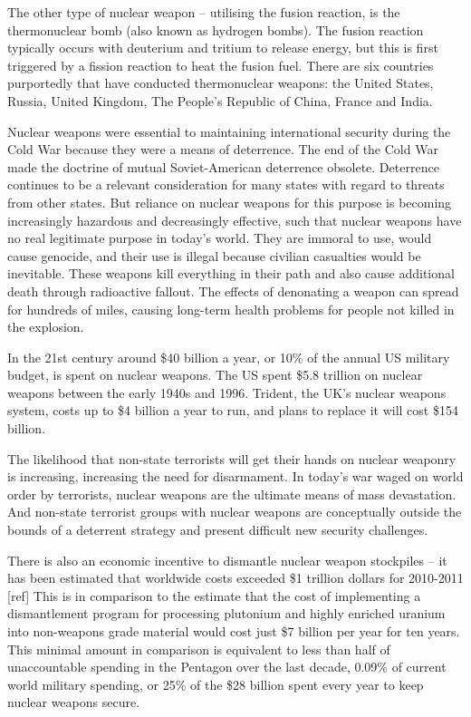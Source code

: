 \documentclass[a4paper]{article}
\begin{document}
The other type of nuclear weapon -- utilising the fusion reaction, is 
the thermonuclear bomb (also known as hydrogen bombs).  The fusion 
reaction typically occurs with deuterium and tritium to release energy, 
but this is first triggered by a fission reaction to heat the fusion fuel. 
There are six countries purportedly that have conducted thermonuclear 
weapons: the United States, Russia, United Kingdom, The People's Republic 
of China, France and India.

Nuclear weapons were essential to maintaining international security during 
the Cold War because they were a means of deterrence. The end of the Cold 
War made the doctrine of mutual Soviet-American deterrence obsolete. 
Deterrence continues to be a relevant consideration for many states with 
regard to threats from other states. But reliance on nuclear weapons for 
this purpose is becoming increasingly hazardous and decreasingly effective, 
such that nuclear weapons have no real legitimate purpose in today’s world. 
They are immoral to use, would cause genocide, and their use is illegal because 
civilian casualties would be inevitable. These weapons kill everything in their 
path and also cause additional death through radioactive fallout. The effects 
of denonating a weapon can spread for hundreds of miles, causing long-term 
health problems for people not killed in the explosion. 

In the 21st century around \$40 billion a year, or 10\% of the annual US 
military budget, is spent on nuclear weapons. The US spent \$5.8 trillion on 
nuclear weapons between the early 1940s and 1996. Trident, the UK’s nuclear 
weapons system, costs up to \$4 billion a year to run, and plans to replace 
it will cost \$154 billion.

The likelihood that non-state terrorists will get their hands on nuclear 
weaponry is increasing, increasing the need for disarmament. In today's war 
waged on world order by terrorists, nuclear weapons are the ultimate means of 
mass devastation. And non-state terrorist groups with nuclear weapons are 
conceptually outside the bounds of a deterrent strategy and present difficult 
new security challenges.

There is also an economic incentive to dismantle nuclear weapon stockpiles -- 
it has been estimated that worldwide costs exceeded \$1 trillion dollars for 
2010-2011 [ref]
This is in comparison to the estimate that the cost of implementing a 
dismantlement program for processing plutonium and highly enriched uranium 
into non-weapons grade material would cost just \$7 billion per year for ten 
years. This minimal amount in comparison is equivalent to less than half of 
unaccountable spending in the Pentagon over the last decade, 0.09\% of current 
world military spending, or 25\% of the \$28 billion spent every year to keep 
nuclear weapons secure.
\end{document}

